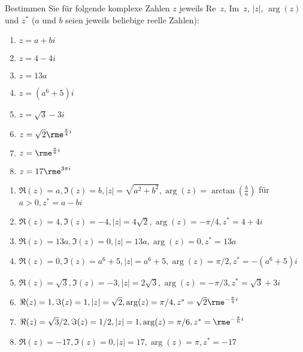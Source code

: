 \documentclass[12pt]{exam}
\begin{document}
\begin{questions}
Bestimmen Sie für folgende komplexe Zahlen $z$ jeweils Re~$z$, Im~$z$, $|z|$, $\arg(z)$ und $z^*$ ($a$ und $b$ seien jeweils beliebige reelle Zahlen):\\
\parbox{0.5\textwidth}{\begin{enumerate}
		\item $z=a+bi$
		\item $z=4-4i$
		\item $z=13a$
		\item $z=(a^6+5)i$
\end{enumerate}}\parbox{0.5\textwidth}{\begin{enumerate}\setcounter{enumi}{4}
		\item $z=\sqrt{3}-3i$
		\item $z=\sqrt{2}\rme^{\frac{\pi}{4}i}$
		\item $z=\rme^{\frac{\pi}{6}i}$
		\item $z=17\rme^{3\pi i}$
\end{enumerate}}
\begin{solution}
	\begin{enumerate}
		\item $\Re(z)= a, \Im(z)= b, |z|= \sqrt{a^2+b^2}, \arg(z)= \arctan(\tfrac{b}{a})$ für $a>0, z^*= a-bi$
		\item $\Re(z)= 4, \Im(z)= -4, |z|= 4\sqrt{2}, \arg(z)= -\pi/4, z^*= 4+4i$
		\item $\Re(z)= 13a, \Im(z)= 0, |z|= 13a, \arg(z)= 0, z^*= 13a$
		\item $\Re(z)= 0, \Im(z)= a^6+5, |z|= a^6+5, \arg(z)= \pi/2, z^*= -(a^6+5)i$
		\item $\Re(z)= \sqrt{3}, \Im(z)= -3, |z|= 2\sqrt{3}, \arg(z)= -\pi/3, z^*= \sqrt{3}+3i$
		\item $\Re(z)= 1, \Im(z)= 1, |z|= \sqrt{2}, \arg(z)= \pi/4, z^*= \sqrt{2}\rme^{-\frac{\pi}{4}i}$
		\item $\Re(z)= \sqrt{3}/2, \Im(z)= 1/2, |z|= 1, \arg(z)= \pi/6, z^*= \rme^{-\frac{\pi}{6}i}$
		\item $\Re(z)= -17, \Im(z)= 0, |z|= 17, \arg(z)= \pi, z^*= -17$
	\end{enumerate}
\end{solution}





\end{questions}
\end{document}
